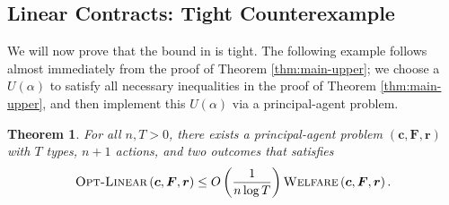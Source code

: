\documentclass{article}
\newtheorem{theorem}{Theorem}
\newcommand{\costvector}{\bm{c}}
\newcommand{\ForecastTensor}{\bm{F}}
\newcommand{\rewardvector}{\bm{r}}
\newcommand{\PrincipalAgentProblem}{\left(\costvector, \ForecastTensor, \rewardvector\right)}
\newcommand{\TransferCoefficient}{\alpha}
\newcommand{\Utility}{U}
\newcommand{\OWelfare}{\textsc{Welfare}}
\newcommand{\OLinear}{\textsc{Opt-Linear}}
\begin{document}
\subsection{Linear Contracts: Tight Counterexample}

We will now prove that the bound in  is tight. The following example follows almost immediately from the proof of Theorem \ref{thm:main-upper}; we choose a $\Utility(\TransferCoefficient)$ to satisfy all necessary inequalities in the proof of Theorem \ref{thm:main-upper}, and then implement this $\Utility(\TransferCoefficient)$ via a principal-agent problem. 

\begin{theorem}
\label{thm:main-lower}
For all $n, T > 0$, there exists a principal-agent problem $\PrincipalAgentProblem$ with $T$ types, $n+1$ actions, and two outcomes that satisfies
\begin{align*}
  \OLinear \PrincipalAgentProblem \le O\left( \frac{1}{n \log T} \right) \OWelfare \PrincipalAgentProblem
  \text{.}
\end{align*}
\end{theorem}
\end{document}
